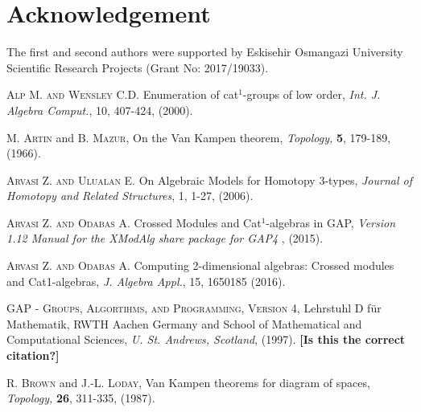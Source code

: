 \documentclass[a4paper,11pt]{article}
\theoremstyle{plain}
\theoremstyle{definition}
\begin{document}
\section*{Acknowledgement}

The first and second authors were supported by Eskisehir Osmangazi
University Scientific Research Projects (Grant No: 2017/19033).

\begin{thebibliography}{99}
	 \textsc{Alp M. and Wensley C.D. } Enumeration of cat$^{1}$-groups 
	of low order, \emph{Int. J. Algebra Comput.}, 10, 407-424, (2000).
	
	 \textsc{M. Artin} and \textsc{B. Mazur}, \textrm{On the Van
		Kampen theorem, }\emph{Topology,} \textbf{5}, 179-189, (1966).
	
	 \textsc{Arvasi Z. and Ulualan E.} On Algebraic Models for
	Homotopy 3-types, \emph{Journal of Homotopy and Related Structures}, 1,
	1-27, (2006).
	
	 \textsc{Arvasi Z. and Odabas A.} Crossed Modules and Cat$%
	^1 $-algebras in \textsf{GAP}, \emph{Version 1.12 Manual for the \textsf{%
			XModAlg} share package for \textsf{GAP}4 }, (2015).
	
	 \textsc{Arvasi Z. and Odabas A.} Computing 2-dimensional
	algebras: Crossed modules and Cat1-algebras, \emph{J. Algebra Appl.}, 15,
	1650185 (2016).
	
	 \textsc{GAP - Groups, Algortihms, and Programming, Version 4},
	Lehrstuhl D f\"{u}r Mathematik, RWTH Aachen Germany and School of
	Mathematical and Computational Sciences, \emph{U. St. Andrews, Scotland},
	(1997). {\bf [Is this the correct citation?]}
	
	
	
	
	 \textsc{R. Brown} and \textsc{J.-L. Loday}, \textrm{Van
		Kampen theorems for diagram of spaces, } \emph{Topology,} \textbf{26},
	311-335, (1987).
	

\end{thebibliography}
\end{document}
